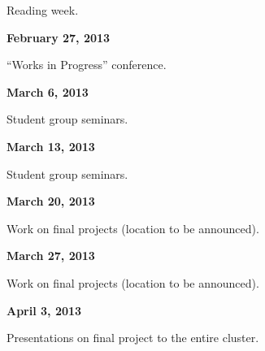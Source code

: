 \documentclass[12pt]{article}
\begin{document}
Reading week.

\newpage

\textbf{February 27, 2013}

``Works in Progress'' conference. 

\textbf{March 6, 2013}

Student group seminars.

\textbf{March 13, 2013}

Student group seminars.

\textbf{March 20, 2013}

Work on final projects (location to be announced).

\textbf{March 27, 2013}

Work on final projects (location to be announced).

\textbf{April 3, 2013}

Presentations on final project to the entire cluster.

\newpage
\end{document}
